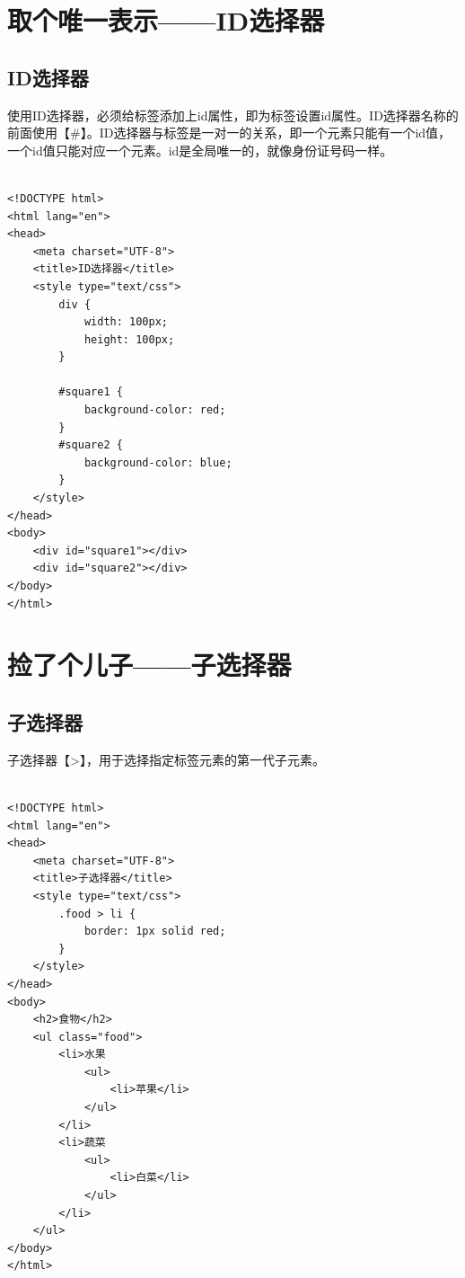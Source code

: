 \newpage

\section{取个唯一表示——ID选择器}

\subsection{ID选择器}

使用ID选择器，必须给标签添加上id属性，即为标签设置id属性。ID选择器名称的前面使用【\#】。ID选择器与标签是一对一的关系，即一个元素只能有一个id值，一个id值只能对应一个元素。id是全局唯一的，就像身份证号码一样。 \\

 \\
\begin{lstlisting}[style=htmlcssjs]
<!DOCTYPE html>
<html lang="en">
<head>
    <meta charset="UTF-8">
    <title>ID选择器</title>
    <style type="text/css">
        div {
            width: 100px;
            height: 100px;
        }

        #square1 {
            background-color: red;
        }
        #square2 {
            background-color: blue;
        }
    </style>
</head>
<body>
    <div id="square1"></div>
    <div id="square2"></div>
</body>
</html>
\end{lstlisting}

\newpage

\section{捡了个儿子——子选择器}

\subsection{子选择器}

子选择器【>】，用于选择指定标签元素的第一代子元素。 \\

 \\
\begin{lstlisting}[style=htmlcssjs]
<!DOCTYPE html>
<html lang="en">
<head>
    <meta charset="UTF-8">
    <title>子选择器</title>
    <style type="text/css">
        .food > li {
            border: 1px solid red;
        }
    </style>
</head>
<body>
    <h2>食物</h2>
    <ul class="food">
        <li>水果
            <ul>
                <li>苹果</li>
            </ul>
        </li>
        <li>蔬菜
            <ul>
                <li>白菜</li>
            </ul>
        </li>
    </ul>
</body>
</html>
\end{lstlisting}

